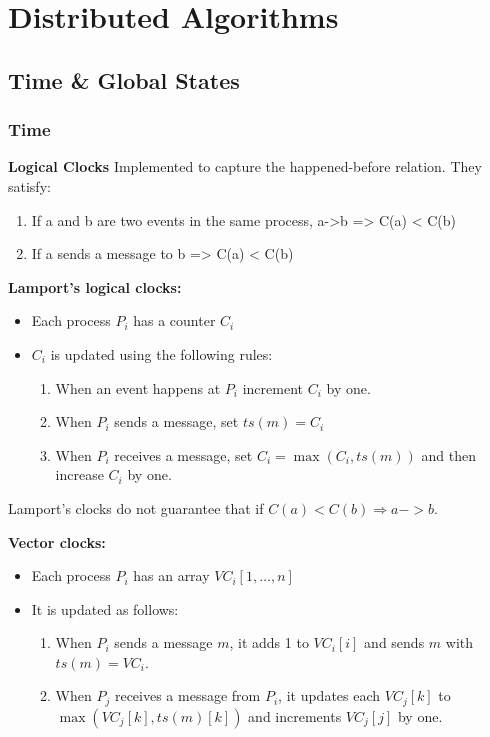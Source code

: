 \section{Distributed Algorithms}

\subsection{Time \& Global States}
\subsubsection*{Time}
\textbf{Logical Clocks}
Implemented to capture the happened-before relation. They satisfy:
\begin{enumerate}
    \item If a and b are two events in the same process, a->b => C(a) < C(b)
    \item If a sends a message to b => C(a) < C(b)
\end{enumerate}

\textbf{Lamport's logical clocks:}
\begin{itemize}
    \item Each process $P_i$ has a counter $C_i$
    \item $C_i$ is updated using the following rules:
    \begin{enumerate}
        \item When an event happens at $P_i$ increment $C_i$ by one.
        \item When $P_i$ sends a message, set $ts(m) = C_i$
        \item When $P_i$ receives a message, set $C_i = \max(C_i, ts(m))$ and then increase $C_i$ by one. 
    \end{enumerate}
\end{itemize}
Lamport's clocks do not guarantee that if $C(a) < C(b) \Rightarrow a -> b$.

\textbf{Vector clocks:}
\begin{itemize}
    \item Each process $P_i$ has an array $VC_i [ 1, \dots, n ]$
    \item It is updated as follows:
    \begin{enumerate}
        \item When $P_i$ sends a message $m$, it adds 1 to $VC_i[i]$ and sends $m$ with $ts(m) = VC_i$.
        \item When $P_j$ receives a message from $P_i$, it updates each $VC_j[k]$ to $\max(VC_j[k], ts(m)[k])$ and increments $VC_j[j]$ by one.
    \end{enumerate}
\end{itemize}

